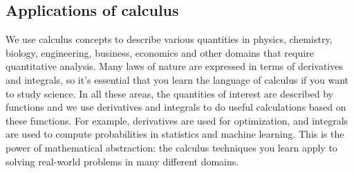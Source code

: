 




	\subsection{Applications of calculus}

		We use calculus concepts
		to describe various quantities in physics, chemistry, biology, engineering,
		business, economics and other domains that require quantitative analysis.
		Many laws of nature are expressed in terms of derivatives and integrals,
		so it's essential that you learn the language of calculus if you want to study science.
		In all these areas,
		the quantities of interest are described by functions
		and we use derivatives and integrals to do useful calculations based on these functions.
		For example,
		derivatives are used for optimization,
		and integrals are used to compute probabilities in statistics and machine learning.
		This is the power of mathematical abstraction:
		the calculus techniques you learn
		apply to solving real-world problems in many different domains.












